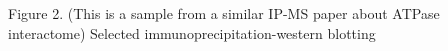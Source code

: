 Figure 2. (This is a sample from a similar IP-MS paper about ATPase interactome) Selected immunoprecipitation-western blotting 